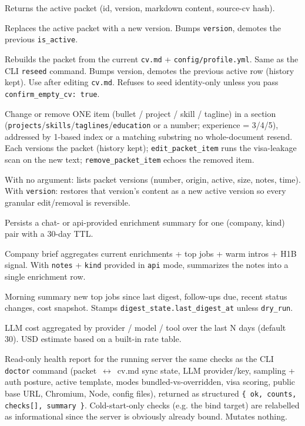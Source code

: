 \documentclass[11pt,letterpaper]{article}
\newcommand{\tool}[1]{\texttt{#1}}
\newcommand{\fpath}[1]{\texttt{#1}}
\newcommand{\cmd}[1]{\texttt{#1}}
\begin{document}
\begin{description}[leftmargin=0pt]
\item[\tool{get\_career\_packet}] Returns the active packet (id, version, markdown content, source-cv hash).
\item[\tool{update\_career\_packet}] Replaces the active packet with a new version. Bumps \texttt{version}, demotes the previous \texttt{is\_active}.
\item[\tool{reseed\_career\_packet}] Rebuilds the packet from the current \fpath{cv.md} + \fpath{config/profile.yml}. Same as the CLI \cmd{reseed} command. Bumps version, demotes the previous active row (history kept). Use after editing \fpath{cv.md}. Refuses to seed identity-only unless you pass \texttt{confirm\_empty\_cv: true}.
\item[\tool{edit\_packet\_item} / \tool{remove\_packet\_item}] Change or remove ONE item (bullet / project / skill / tagline) in a section (\texttt{projects}/\texttt{skills}/\texttt{taglines}/\texttt{education} or a number; experience = 3/4/5), addressed by 1-based index or a matching substring \textemdash{} no whole-document resend. Each versions the packet (history kept); \tool{edit\_packet\_item} runs the visa-leakage scan on the new text; \tool{remove\_packet\_item} echoes the removed item.
\item[\tool{restore\_packet\_version}] With no argument: lists packet versions (number, origin, active, size, notes, time). With \texttt{version}: restores that version's content as a new active version \textemdash{} so every granular edit/removal is reversible.
\item[\tool{enrich\_company}] Persists a chat- or api-provided enrichment summary for one (company, kind) pair with a 30-day TTL.
\item[\tool{deep\_research}] Company brief \textemdash{} aggregates current enrichments + top jobs + warm intros + H1B signal. With \texttt{notes} + \texttt{kind} provided in \texttt{api} mode, summarizes the notes into a single enrichment row.
\item[\tool{daily\_digest}] Morning summary \textemdash{} new top jobs since last digest, follow-ups due, recent status changes, cost snapshot. Stamps \texttt{digest\_state.last\_digest\_at} unless \texttt{dry\_run}.
\item[\tool{cost\_estimate}] LLM cost aggregated by provider / model / tool over the last N days (default 30). USD estimate based on a built-in rate table.
\item[\tool{doctor}] Read-only health report for the running server \textemdash{} the same checks as the CLI \cmd{doctor} command (packet~$\leftrightarrow$~cv.md sync state, LLM provider/key, sampling + auth posture, active template, modes bundled-vs-overridden, visa scoring, public base URL, Chromium, Node, config files), returned as structured \texttt{\{ ok, counts, checks[], summary \}}. Cold-start-only checks (e.g. the bind target) are relabelled as informational since the server is obviously already bound. Mutates nothing.
\end{description}
\end{document}
